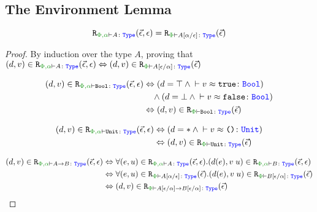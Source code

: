 \documentclass{Report}
\begin{document}
\subsection{The Environment Lemma}


\begin{lemma}
    $$\erelates{\P,\a}{A}(\ev, \e) = \erelates{\P}{A\ssub{\e}{\a}}(\ev)$$
\end{lemma}

\begin{proof}
    By induction over the type $A$, proving that $\inLogRel{d}{v}{\P,\a}{A}{\ev, \e} \Leftrightarrow \inLogRelPE{d}{v}{A\ssub{\a}{\e}}$

        \begin{align*}
            \inLogRel{d}{v}{\P,\a}{\B}{\ev, \e} & \Leftrightarrow (d = \top \wedge \zberelation{v}{\t}{\B})
            \\ 
            & \quad\wedge(d = \bot \wedge \zberelation{v}{\f}{\B})
            \\
            & \Leftrightarrow  \inLogRelPE{d}{v}{\B}
        \end{align*}

    \begin{align*}
        \inLogRel{d}{v}{\P,\a}{\U}{\ev, \e} & \Leftrightarrow (d = \singleton \wedge \zberelation{v}{\u}{\U})
        \\
        & \Leftrightarrow  \inLogRelPE{d}{v}{\U}
    \end{align*}

    \case{\tfun}
    \begin{align*}
        \inLogRel{d}{v}{\P,\a}{\ab}{\ev, \e} & \Leftrightarrow \forall\inLogRel{e}{u}{\P,\a}{A}{\ev, \e}. \inLogRel{d(e)}{\apply{v}{u}}{\P,\a}{B}{\ev, \e} 
        \\
        & \Leftrightarrow 
        \forall\inLogRelPE{e}{u}{A\ssub{\e}{\a}}. \inLogRelPE{d(e)}{\apply{v}{u}}{B\ssub{\a}{\e}}
        \\
        & \Leftrightarrow  \inLogRelPE{d}{v}{\fntype{A\ssub{\a}{\e}}{B\ssub{\a}{\e}}}
        \\
    \end{align*}

    \case{\teffect}


\end{proof}
\end{document}
